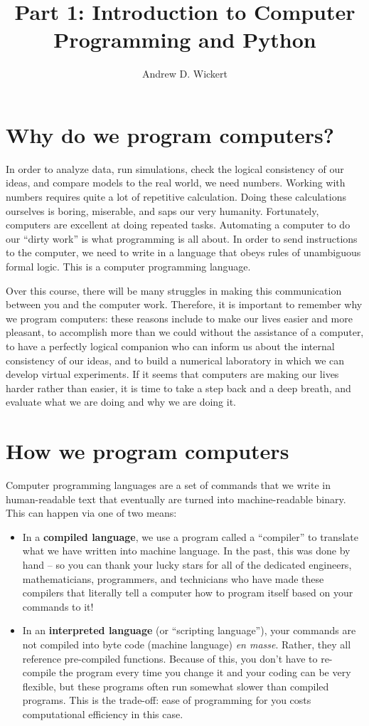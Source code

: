 \documentclass[a4paper,10pt]{scrartcl}
\title{Part 1: Introduction to Computer Programming and Python}
\author{Andrew D. Wickert}
\begin{document}
\maketitle

\section{Why do we program computers?}

In order to analyze data, run simulations, check the logical consistency of our ideas, and compare models to the real world, we need numbers. Working with numbers requires quite a lot of repetitive calculation. Doing these calculations ourselves is boring, miserable, and saps our very humanity. Fortunately, computers are excellent at doing repeated tasks. Automating a computer to do our ``dirty work'' is what programming is all about. In order to send instructions to the computer, we need to write in a language that obeys rules of unambiguous formal logic. This is a computer programming language.

Over this course, there will be many struggles in making this communication between you and the computer work. Therefore, it is important to remember why we program computers: these reasons include to make our lives easier and more pleasant, to accomplish more than we could without the assistance of a computer, to have a perfectly logical companion who can inform us about the internal consistency of our ideas, and to build a numerical laboratory in which we can develop virtual experiments. If it seems that computers are making our lives harder rather than easier, it is time to take a step back and a deep breath, and evaluate what we are doing and why we are doing it.

\section{How we program computers}

Computer programming languages are a set of commands that we write in human-readable text that eventually are turned into machine-readable binary. This can happen via one of two means:
\begin{itemize}
 \item In a \textbf{compiled language}, we use a program called a ``compiler'' to translate what we have written into machine language. In the past, this was done by hand -- so you can thank your lucky stars for all of the dedicated engineers, mathematicians, programmers, and technicians who have made these compilers that literally tell a computer how to program itself based on your commands to it!
 \item In an \textbf{interpreted language} (or ``scripting language''), your commands are not compiled into byte code (machine language) \textit{en masse}. Rather, they all reference pre-compiled functions. Because of this, you don't have to re-compile the program every time you change it and your coding can be very flexible, but these programs often run somewhat slower than compiled programs. This is the trade-off: ease of programming for you costs computational efficiency in this case.
\end{itemize}
\end{document}
